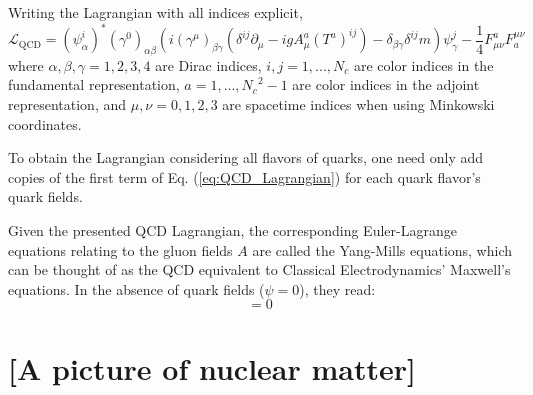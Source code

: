
Writing the Lagrangian with all indices explicit,
\begin{equation}
	\mathcal{L}_{\text{QCD}} = \left(\psi_\alpha^i \right)^*  \left( \gamma^0  \right)_{\alpha \beta} \left(i \left(\gamma^\mu \right)_{\beta \gamma} \left( \delta^{ij} \partial_\mu - i g A^a_\mu \left( T^a \right)^{ij} \right) - \delta_{\beta \gamma} \delta^{ij} m \right) \psi_\gamma^j - \frac{1}{4} F_{\mu \nu}^a F^{\mu \nu}_a 
	\label{eq:QCD_Lagrangian_Indices}
\end{equation}
where $\alpha, \beta, \gamma = 1,2,3,4$ are Dirac indices, $i,j=1, ..., N_c$ are color indices in the fundamental representation, $a = 1, ..., {N_c}^2-1$ are color indices in the adjoint representation, and $\mu,\nu = 0,1,2,3$ are spacetime indices when using Minkowski coordinates.

 To obtain the Lagrangian considering all flavors of quarks, one need only add copies of the first term of Eq. (\ref{eq:QCD_Lagrangian}) for each quark flavor's quark fields.
 
Given the presented QCD Lagrangian, the corresponding Euler-Lagrange equations relating to the gluon fields $A$ are called the Yang-Mills equations, which can be thought of as the QCD equivalent to Classical Electrodynamics' Maxwell's equations. 
In the absence of quark fields ($\psi=0$), they read:
\begin{equation}
	[D_\mu, F^{\mu \nu}] = 0
	\label{eq:homogenous_Yang-Mills}
\end{equation}

\section{[A picture of nuclear matter]}
\label{sec:nuclear_matter}

